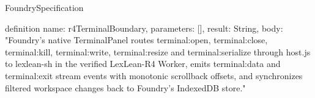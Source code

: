 \begin{lexlean}{FoundrySpecification}
\begin{semanticmodule}
definition{
  name: r4TerminalBoundary,
  parameters: [],
  result: String,
  body: "Foundry's native TerminalPanel routes terminal:open, terminal:close, terminal:kill, terminal:write, terminal:resize and terminal:serialize through host.js to lexlean-sh in the verified LexLean-R4 Worker, emits terminal:data and terminal:exit stream events with monotonic scrollback offsets, and synchronizes filtered workspace changes back to Foundry's IndexedDB store."
}
\end{semanticmodule}
\end{lexlean}
